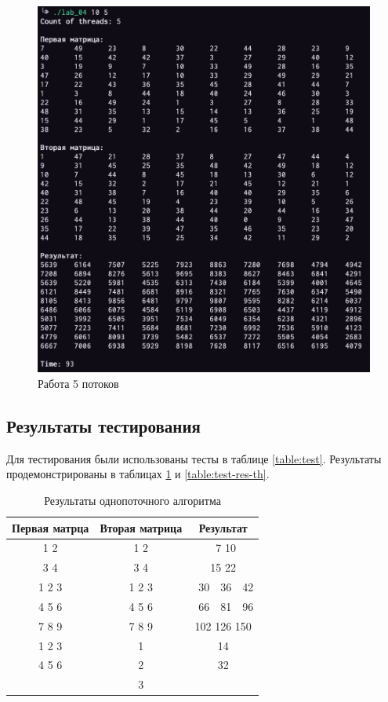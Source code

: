 \documentclass[a4paper,12pt]{article}
\begin{document}
\begin{figure}[H]
    \centering
    \includegraphics[scale=0.6]{ten}
    \caption{Работа 5 потоков}
    \label{img:ten}
\end{figure}

\subsection{Результаты тестирования}

Для тестирования были использованы тесты в таблице \ref{table:test}.
Результаты продемонстрированы в таблицах \ref{table:test-res} и \ref{table:test-res-th}.

\begin{table}[H]
    \caption{Результаты однопоточного алгоритма}
    \label{table:test-res}
    \centering
    \begin{tabular}{|c|c|c|}
        \hline
        Первая матрца & Вторая матрица & Результат \\
        \hline
        1 2 & 1 2 & \ 7 10 \\
        3 4 & 3 4 & 15 22 \\
        \hline
        1 2 3 & 1 2 3 & \ 30\ \ 36\ \ 42 \\
        4 5 6 & 4 5 6 & \ 66\ \ 81\ \ 96 \\
        7 8 9 & 7 8 9 & 102 126 150 \\
        \hline
        1 2 3 & 1 & 14 \\
        4 5 6 & 2 & 32 \\
              & 3 & \\
        \hline
    \end{tabular}
\end{table}
\end{document}
